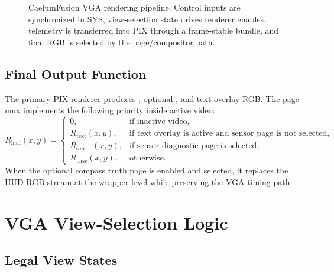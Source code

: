 \documentclass[12pt,letterpaper,final,onecolumn,titlepage]{article}
\DeclareRobustCommand{\sig}[1]{\texttt{\detokenize{#1}}}
\begin{document}
\begin{figure}[H]
{}
\caption[CaelumFusion VGA rendering pipeline]{CaelumFusion VGA rendering pipeline.  Control inputs are synchronized in SYS, view-selection state drives renderer enables, telemetry is transferred into PIX through a frame-stable bundle, and final RGB is selected by the page/compositor path.}
\label{fig:pipeline}
\end{figure}

\subsection{Final Output Function}

The primary PIX renderer produces \sig{hud_rgb}, optional
\sig{sensor_diag_rgb}, and text overlay RGB.  The page mux implements the
following priority inside active video:
\[
R_{\mathrm{hud}}(x,y)=
\begin{cases}
0, & \text{if inactive video},\\
R_{\mathrm{text}}(x,y), & \text{if text overlay is active and sensor page is not selected},\\
R_{\mathrm{sensor}}(x,y), & \text{if sensor diagnostic page is selected},\\
R_{\mathrm{base}}(x,y), & \text{otherwise}.
\end{cases}
\]
When the optional compass truth page is enabled and selected, it replaces the
HUD RGB stream at the wrapper level while preserving the VGA timing path.

\section{VGA View-Selection Logic}

\subsection{Legal View States}
\end{document}
